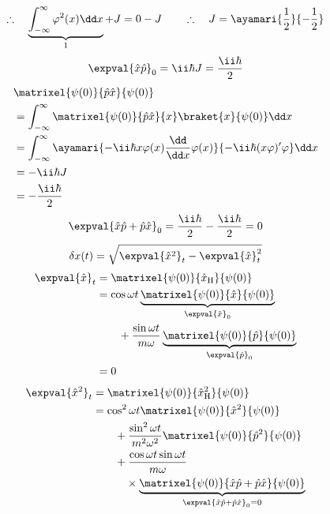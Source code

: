 \[ \therefore\quad\underbrace{\int_{-\infty}^{\infty}\varphi^{2}(x)\dd x}_{1}+J=0-J\qquad\therefore\quad J=\ayamari{\frac{1}{2}}{-\frac{1}{2}} \]
\[ \expval{\hat{x}\hat{p}}_{0}=\ii\hbar J=\frac{\ii\hbar}{2} \]
\begin{align*}
&\matrixel{\psi(0)}{\hat{p}\hat{x}}{\psi(0)}\\
&=\int_{-\infty}^{\infty}\matrixel{\psi(0)}{\hat{p}\hat{x}}{x}\braket{x}{\psi(0)}\dd x\\
&=\int_{-\infty}^{\infty}\ayamari{-\ii\hbar x\varphi(x)\frac{\dd}{\dd x}\varphi(x)}{-\ii\hbar(x\varphi)'\varphi}\dd x\\
&=-\ii\hbar J\\
&=-\frac{\ii\hbar}{2}
\end{align*}
\[ \expval{\hat{x}\hat{p}+\hat{p}\hat{x}}_{0}=\frac{\ii\hbar}{2}-\frac{\ii\hbar}{2}=0 \]
\[ \delta x(t)=\sqrt{\expval{\hat{x}^{2}}_{t}-\expval{\hat{x}}_{t}^{2}} \]
\begin{align*}
\expval{\hat{x}}_{t}&=\matrixel{\psi(0)}{\hat{x}_{\mathrm{H}}}{\psi(0)}\\
&=\cos\omega t\underbrace{\matrixel{\psi(0)}{\hat{x}}{\psi(0)}}_{\expval{\hat{x}}_{0}}\\
&\qquad+\frac{\sin\omega t}{m\omega}\underbrace{\matrixel{\psi(0)}{\hat{p}}{\psi(0)}}_{\expval{\hat{p}}_{0}}\\
&=0
\end{align*}
\begin{align*}
\expval{\hat{x}^{2}}_{t}&=\matrixel{\psi(0)}{\hat{x}_{\mathrm{H}}^{2}}{\psi(0)}\\
&=\cos^{2}\omega t\matrixel{\psi(0)}{\hat{x}^{2}}{\psi(0)}\\
&\qquad+\frac{\sin^{2}\omega t}{m^{2}\omega^{2}}\matrixel{\psi(0)}{\hat{p}^{2}}{\psi(0)}\\
&\qquad+\frac{\cos\omega t\sin\omega t}{m\omega}\\
&\qquad\quad\times\underbrace{\matrixel{\psi(0)}{\hat{x}\hat{p}+\hat{p}\hat{x}}{\psi(0)}}_{\expval{\hat{x}\hat{p}+\hat{p}\hat{x}}_{0}=0}
\end{align*}
